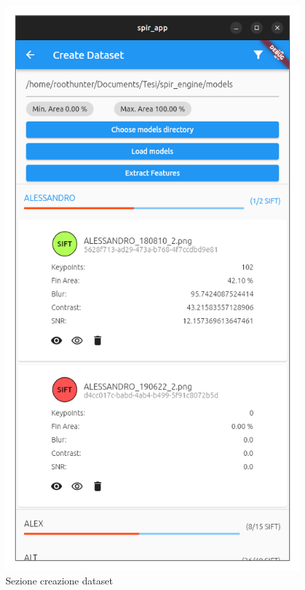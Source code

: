 \documentclass[a4paper,12pt]{report}
\begin{document}
    \begin{figure}[H]
      \centering
      \begin{minipage}{0.3\textwidth}
        \centering
        \includegraphics[width=\textwidth]{assets/images/methods/frontend/dataset.png}   
        \caption{Sezione creazione dataset}
      \end{minipage}

\end{figure}
\end{document}
